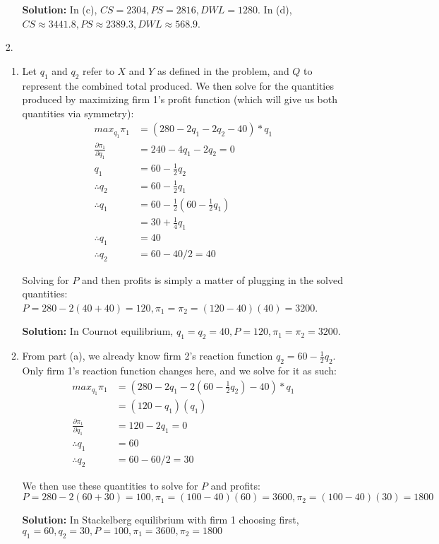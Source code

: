 \documentclass[12pt,letterpaper]{article}
\begin{document}
\begin{enumerate}
\begin{enumerate}
	{\color{blue} \textbf{Solution:} In (c), $CS = 2304, PS = 2816, DWL=1280$. In (d), $CS \approx 3441.8, PS \approx 2389.3, DWL \approx 568.9$.}

\end{enumerate}

\item[2.]

\begin{enumerate}
	\item Let $q_1$ and $q_2$ refer to $X$ and $Y$ as defined in the problem, and $Q$ to represent the combined total produced. We then solve for the quantities produced by maximizing firm 1's profit function (which will give us both quantities via symmetry):
	\begin{align*}
		max_{q_1} \pi_1 &= (280 - 2q_1 - 2q_2 - 40)*q_1 \\
		\frac{\partial\pi_1}{\partial q_1} &= 240 - 4q_1 - 2q_2 = 0 \\
		q_1 &= 60 - \frac{1}{2}q_2 \\
		\therefore q_2 &= 60 - \frac{1}{2}q_1 \\
		\therefore q_1 &= 60 - \frac{1}{2}(60 - \frac{1}{2}q_1) \\
		&= 30 + \frac{1}{4}q_1 \\
		\therefore q_1 &= 40 \\
		\therefore q_2 &= 60 - 40/2 = 40
	\end{align*}

	Solving for $P$ and then profits is simply a matter of plugging in the solved quantities: $P=280 - 2(40+40) = 120, \pi_1 = \pi_2 = (120-40)(40) = 3200$.

	{\color{blue} \textbf{Solution:} In Cournot equilibrium, $q_1 = q_2 = 40, P=120, \pi_1=\pi_2 = 3200$.}

	\item From part (a), we already know firm 2's reaction function $q_2 = 60 - \frac{1}{2}q_2$. Only firm 1's reaction function changes here, and we solve for it as such:
	\begin{align*}
		max_{q_1} \pi_1 &= (280 - 2q_1 - 2(60 - \frac{1}{2}q_2) - 40)*q_1 \\
		&= (120-q_1)(q_1) \\
		\frac{\partial\pi_1}{\partial q_1} &= 120 - 2q_1 = 0 \\
		\therefore q_1 &= 60 \\
		\therefore q_2 &= 60 - 60/2 = 30
	\end{align*}

	We then use these quantities to solve for $P$ and profits: $P = 280 - 2(60 + 30) = 100, \pi_1 = (100-40)(60) = 3600, \pi_2 = (100-40)(30) = 1800$

	{\color{blue}\textbf{Solution:} In Stackelberg equilibrium with firm 1 choosing first, $q_1 = 60, q_2 = 30, P = 100, \pi_1 = 3600, \pi_2 = 1800$}
\end{enumerate}


\end{enumerate}
	
\end{document}
